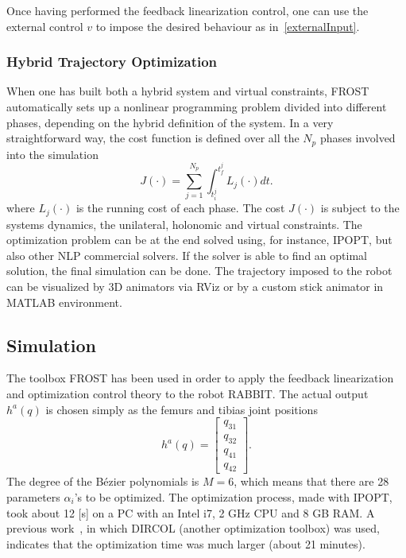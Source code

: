 \documentclass[11pt]{article}
\begin{document}
Once having performed the feedback linearization control, one can use the external control $v$ to impose the desired behaviour as in~\eqref{externalInput}.

\subsubsection{Hybrid Trajectory Optimization}

When one has built both a hybrid system and virtual constraints, FROST automatically sets up a nonlinear programming problem divided into different phases, depending on the hybrid definition of the system. In a very straightforward way, the cost function is defined over all the $N_p$ phases involved into the simulation
\begin{equation}
    J(\cdot) = \sum_{j=1}^{N_p} \int_{t_i^j}^{t_f^j} L_j(\cdot) dt.
    \label{FROSTcostfcn}
\end{equation}
where $L_j(\cdot)$ is the running cost of each phase. The cost $J(\cdot)$ is subject to the systems dynamics, the unilateral, holonomic and virtual constraints. The optimization problem can be at the end solved using, for instance, IPOPT, but also other NLP commercial solvers. If the solver is able to find an optimal solution, the final simulation can be done. The trajectory imposed to the robot can be visualized by 3D animators via RViz or by a custom stick animator in MATLAB environment.

\subsection{Simulation}

The toolbox FROST has been used in order to apply the feedback linearization and optimization control theory to the robot RABBIT. The actual output $h^a(q)$ is chosen simply as the femurs and tibias joint positions
\[
h^a(q) = 
\begin{bmatrix}
q_{31} \\
q_{32} \\
q_{41} \\
q_{42}
\end{bmatrix}.
\]
The degree of the Bézier polynomials is $M = 6$, which means that there are 28 parameters $\alpha_i$'s to be optimized. The optimization process, made with IPOPT, took about 12 [s] on a PC with an Intel i7, 2 GHz CPU and 8 GB RAM. A previous work~\cite{westervelt}, in which DIRCOL (another optimization toolbox) was used, indicates that the optimization time was much larger (about 21 minutes). 
\end{document}
